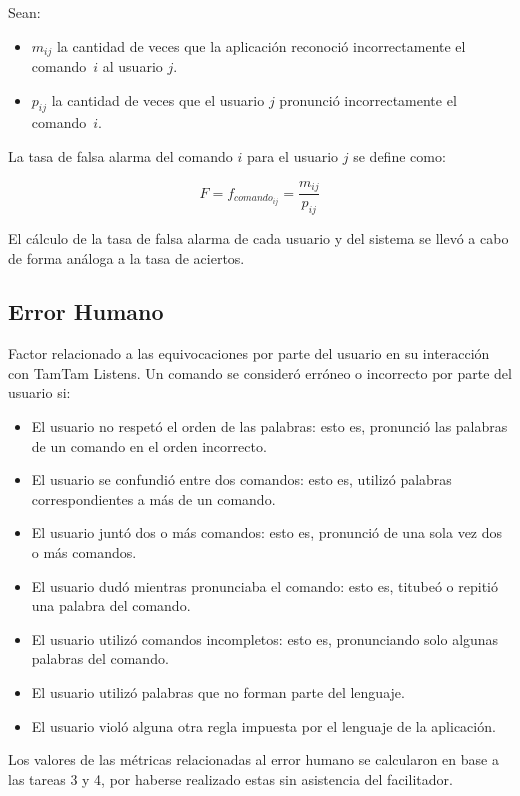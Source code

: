 \begin{itemize}
	Sean:

	\begin{itemize}
		\item $m_{ij}$ la cantidad de veces que la aplicaci\'on reconoci\'o incorrectamente el \mbox{comando $i$}
		al usuario $j$.
		\item $p_{ij}$ la cantidad de veces que el usuario $j$ pronunci\'o incorrectamente el \mbox{comando $i$.}
	\end{itemize}
	La tasa de falsa alarma del comando $i$ para el usuario $j$ se define como: 

	\begin{equation*}
		F=f_{{comando}_{ij}}=\frac{m_{ij}}{p_{ij}}
	\end{equation*}

	El c\'alculo de la tasa de falsa alarma de cada usuario y del sistema se llev\'o a cabo de forma an\'aloga 
	a la tasa de aciertos.
\end{itemize}

\subsection{Error Humano}
Factor relacionado a las equivocaciones por parte del usuario en su interacci\'on con
TamTam Listens.
Un comando se consider\'o err\'oneo o incorrecto por parte del usuario si:
\begin{itemize}
	\item El usuario no respet\'o el orden de las palabras: esto es, pronunci\'o las palabras de un comando en el orden incorrecto.
	\item El usuario se confundi\'o entre dos comandos: esto es, utiliz\'o palabras correspondientes a m\'as de un comando.
	\item El usuario junt\'o dos o m\'as comandos: esto es, pronunci\'o de una sola vez dos o m\'as comandos.
	\item El usuario dud\'o mientras pronunciaba el comando: esto es, titube\'o o repiti\'o una palabra del comando.
	\item El usuario utiliz\'o comandos incompletos: esto es, pronunciando solo algunas palabras del comando.
	\item El usuario utiliz\'o palabras que no forman parte del lenguaje.
	\item El usuario viol\'o alguna otra regla impuesta por el lenguaje de la aplicaci\'on.
\end{itemize}
Los valores de las m\'etricas relacionadas al error humano se calcularon
en base a las tareas 3 y 4, por haberse realizado estas sin asistencia del facilitador. 

